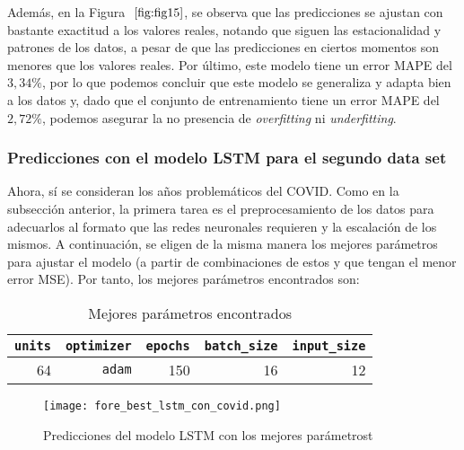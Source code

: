 \documentclass[12pt,twoside]{article}
\begin{document}
Además, en la Figura $~\ref{fig:fig15}$, se observa que las predicciones se ajustan con bastante exactitud a los valores reales, notando que siguen las estacionalidad y patrones de los datos, a pesar de que las predicciones en ciertos momentos son menores que los valores reales. Por último, este modelo tiene un error MAPE del $3,34\%$, por lo que podemos concluir que este modelo se generaliza y adapta bien a los datos y, dado que el conjunto de entrenamiento tiene un error MAPE del $2,72\%$, podemos asegurar la no presencia de \textit{overfitting} ni \textit{underfitting}.

\subsubsection{Predicciones con el modelo LSTM para el segundo data set}\label{sec:20}

Ahora, sí se consideran los años problemáticos del COVID. Como en la subsección anterior, la primera tarea es el preprocesamiento de los datos para adecuarlos al formato que las redes neuronales requieren y la escalación de los mismos. A continuación, se eligen de la misma manera los mejores parámetros para ajustar el modelo (a partir de combinaciones de estos y que tengan el menor error MSE). Por tanto, los mejores parámetros encontrados son: 

\begin{table}[ht] 
\centering
\begin{tabular}{rrrrr} 
  \hline
 \texttt{units} & \texttt{optimizer} & \texttt{epochs} & \texttt{batch\_size} & \texttt{input\_size} \\ 
  \hline
64 & \texttt{adam} & 150 & 16 & 12 \\ 
   \hline
\end{tabular}
\caption{Mejores parámetros encontrados} \label{tab:01}
\end{table}

\begin{figure}[h]
    \centering
    \texttt{[image: fore\_best\_lstm\_con\_covid.png]}
    \caption{Predicciones del modelo LSTM con los mejores parámetrost} 
    \label{fig:fig16}
\end{figure}

\end{document}
